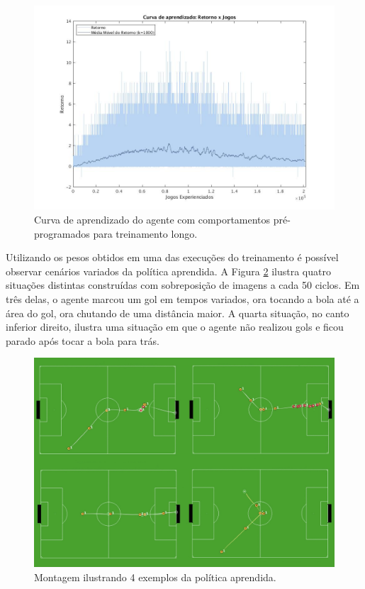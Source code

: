 \begin{figure}[H]
	\includegraphics[width=1\linewidth]{figs/curvalonga-behaviors-tabular.jpg}
	\centering
	\caption{Curva de aprendizado do agente com comportamentos pré-programados para treinamento longo.}
	\label{fig:curvalonga-bhv}
\end{figure}

Utilizando os pesos obtidos em uma das execuções do treinamento é possível observar cenários variados da política aprendida. A Figura \ref{fig:behaviors-result} ilustra quatro situações distintas construídas com sobreposição de imagens a cada 50 ciclos. Em três delas, o agente marcou um gol em tempos variados, ora tocando a bola até a área do gol, ora chutando de uma distância maior. A quarta situação, no canto inferior direito, ilustra uma situação em que o agente não realizou gols e ficou parado após tocar a bola para trás.

\begin{figure}[H]
	\includegraphics[width=1\linewidth]{figs/behaviors-result.jpg}
	\centering
	\caption{Montagem ilustrando 4 exemplos da política aprendida.}
	\label{fig:behaviors-result}
\end{figure}


